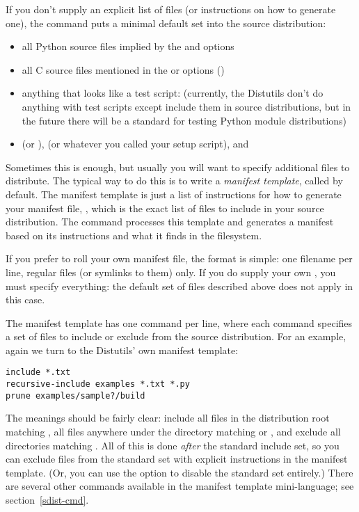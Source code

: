 \documentclass{howto}
\begin{document}
If you don't supply an explicit list of files (or instructions on how to
generate one), the  command puts a minimal default set
into the source distribution:
\begin{itemize}
\item all Python source files implied by the  and
   options
\item all C source files mentioned in the  or
   options ()
\item anything that looks like a test script: 
  (currently, the Distutils don't do anything with test scripts except
  include them in source distributions, but in the future there will be
  a standard for testing Python module distributions)
\item {} (or ),  (or whatever 
  you called your setup script), and 
\end{itemize}
Sometimes this is enough, but usually you will want to specify
additional files to distribute.  The typical way to do this is to write
a \emph{manifest template}, called  by default.  The
manifest template is just a list of instructions for how to generate
your manifest file, , which is the exact list of files to
include in your source distribution.  The  command
processes this template and generates a manifest based on its
instructions and what it finds in the filesystem.

If you prefer to roll your own manifest file, the format is simple: one
filename per line, regular files (or symlinks to them) only.  If you do
supply your own , you must specify everything: the
default set of files described above does not apply in this case.

The manifest template has one command per line, where each command
specifies a set of files to include or exclude from the source
distribution.  For an example, again we turn to the Distutils' own
manifest template:
\begin{verbatim}
include *.txt
recursive-include examples *.txt *.py
prune examples/sample?/build
\end{verbatim}
The meanings should be fairly clear: include all files in the
distribution root matching , all files anywhere under the
 directory matching  or , and
exclude all directories matching .  All of
this is done \emph{after} the standard include set, so you can exclude
files from the standard set with explicit instructions in the manifest
template.  (Or, you can use the  option to
disable the standard set entirely.)  There are several other commands
available in the manifest template mini-language; see
section~\ref{sdist-cmd}.
\end{document}
